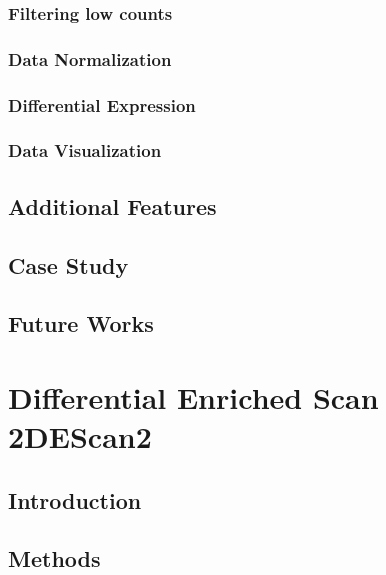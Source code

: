 \documentclass[b5paper,oneside,british,intoc,bibliograph=totoc,index=totoc,BCOR10mm,twoside,openright]{book}
\numberwithin{equation}{section}
\numberwithin{figure}{section}
\begin{document}
\subsection{Filtering low counts} \label{sec:ticorserfiltering}

\subsection{Data Normalization} \label{sec:ticorsernormalization}

\subsection{Differential Expression} \label{sec:ticorsermethods}

\subsection{Data Visualization} \label{sec:ticorserplots}

\section{Additional Features} \label{sec:ticorseraddfeat}

\section{Case Study} \label{sec:ticorseresults}

\section{Future Works} \label{sec:ticorseconclusions}



\chapter{Differential Enriched Scan 2\newline DEScan2} \label{sec:descan2cap}

\section{Introduction} \label{sec:descan2intro}

\section{Methods} \label{sec:descan2methods}

\end{document}
